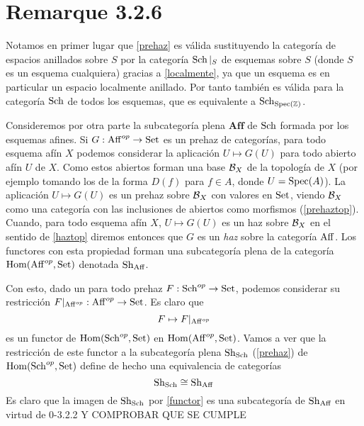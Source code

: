 \documentclass[twoside]{article}
\begin{document}
\section{Remarque 3.2.6}

Notamos en primer lugar que \ref{prehaz} es válida sustituyendo la categoría de espacios anillados sobre $S$ por la categoría $\operatorname{Sch}|_{S}$ de esquemas sobre $S$ (donde $S$ es un esquema cualquiera) gracias a \ref{localmente}, ya que un esquema es en particular un espacio localmente anillado. Por tanto también es válida para la categoría $\operatorname{Sch}$ de todos los esquemas, que es equivalente a $\operatorname{Sch}_{\operatorname{Spec}(\mathbb{Z})}$.

Consideremos por otra parte la subcategoría plena $\mathrm{\mathbf{Aff}}$ de $\operatorname{Sch}$ formada por los esquemas afines. Si $G:\operatorname{Aff}^{op}\to\operatorname{Set}$ es un prehaz de categorías, para todo esquema afín $X$ podemos considerar la aplicación $U\mapsto G(U)$ para todo abierto afín $U$ de $X$. Como estos abiertos forman una base ${\mathcal B}_X$ de la topología de $X$ (por ejemplo tomando los de la forma $D(f)$ para $f\in A$, donde $U=\operatorname{Spec}(A)$). La aplicación $U\mapsto G(U)$ es un prehaz sobre ${\mathcal B}_X$ con valores en $\operatorname{Set}$, viendo ${\mathcal B}_X$ como una categoría con las inclusiones de abiertos como morfismos (\ref{prehaztop}). Cuando, para todo esquema afín $X$, $U\mapsto G(U)$ es un haz sobre ${\mathcal B}_X$ en el sentido de \ref{haztop} diremos entonces que $G$ es un \emph{haz} sobre la categoría $\operatorname{Aff}$. Los functores con esta propiedad forman una subcategoría plena de la categoría $\operatorname{Hom}(\operatorname{Aff}^{op},\operatorname{Set})$ denotada $\operatorname{Sh}_{\operatorname{Aff}}$. 

Con esto, dado un para todo prehaz $F:\operatorname{Sch}^{op}\to \operatorname{Set}$, podemos considerar su restricción $F|_{\operatorname{Aff}^{op}}:\operatorname{Aff}^{op}\to\operatorname{Set}$. Es claro que
\begin{equation}\label{functor}
F\mapsto F|_{\operatorname{Aff}^{op}}
\end{equation}
es un functor de $\operatorname{Hom}(\operatorname{Sch}^{op},\operatorname{Set})$ en $\operatorname{Hom}(\operatorname{Aff}^{op},\operatorname{Set})$. Vamos a ver que la restricción de este functor a la subcategoría plena $\operatorname{Sh}_{\operatorname{Sch}}$ (\ref{prehaz}) de $\operatorname{Hom}(\operatorname{Sch}^{op},\operatorname{Set})$ define de hecho una equivalencia de categorías 
\[\operatorname{Sh}_{\operatorname{Sch}}\cong\operatorname{Sh}_{\operatorname{Aff}}\]
Es claro que la imagen de $\operatorname{Sh}_{\operatorname{Sch}}$ por \ref{functor} es una subcategoría de $\operatorname{Sh}_{\operatorname{Aff}}$ en virtud de 0-3.2.2 Y COMPROBAR QUE SE CUMPLE
\end{document}
